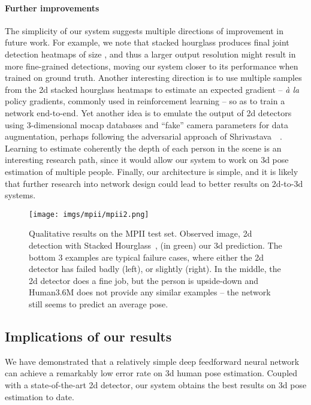 \documentclass[10pt,twocolumn,letterpaper]{article}
\begin{document}
\paragraph{Further improvements}
The simplicity of our system suggests multiple directions of improvement in future work.
For example, we note that stacked hourglass produces final joint detection heatmaps of size , and thus a larger output resolution might result in more fine-grained detections, moving our system closer to its performance when trained on ground truth.
Another interesting direction is to use multiple samples from the 2d stacked hourglass heatmaps to estimate an expected gradient -- \emph{{\`a} la} policy gradients, commonly used in reinforcement learning -- so as to train a network end-to-end.
Yet another idea is to emulate the output of 2d detectors using 3-dimensional mocap databases and ``fake'' camera parameters for data augmentation, perhaps following the adversarial approach of Shrivastava~\etal~\cite{shrivastava2016learning}.
Learning to estimate coherently the depth of each person in the scene is an interesting research path, since it would allow our system to work on 3d pose estimation of multiple people.
Finally, our architecture is simple, and it is likely that further research into network design could lead to better results on 2d-to-3d systems.

\begin{figure*}[t]
  \texttt{[image: imgs/mpii/mpii2.png]}
  \vspace{-3mm}
  \caption{Qualitative results on the MPII test set. Observed image, 2d detection with Stacked Hourglass~\cite{stacked-hourglass}, (in green) our 3d prediction. The bottom 3 examples are typical failure cases, where either the 2d detector has failed badly (left), or slightly (right). In the middle, the 2d detector does a fine job, but the person is upside-down and Human3.6M does not provide any similar examples -- the network still seems to predict an average pose.}
  \label{fig:mpii}
\end{figure*}

\subsection{Implications of our results}
We have demonstrated that a relatively simple deep feedforward neural network
can achieve a remarkably low error rate on 3d human pose estimation. Coupled with a state-of-the-art 2d detector, our system 
obtains the best results on 3d pose estimation to date.
\end{document}
